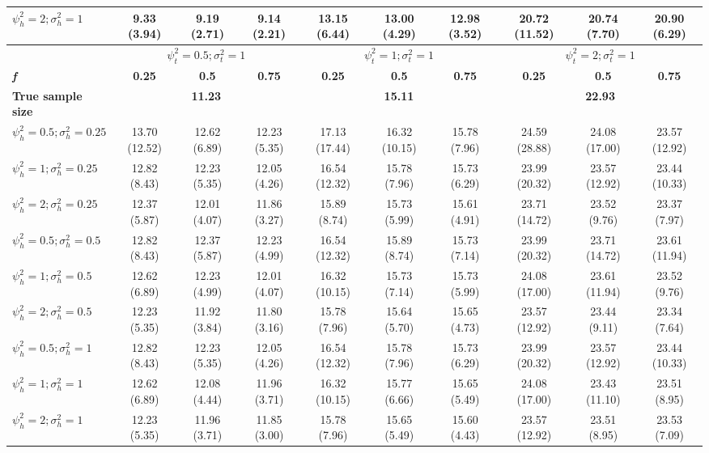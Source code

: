 \documentclass[AMA,STIX1COL,]{WileyNJD-v2}
\begin{document}
\begin{table}[ht]
{\begin{tabular}{l c c c c c c c c c}
$\psi_h^2 = 2; \sigma_h^2 = 1$ & 9.33 (3.94) & 9.19 (2.71) & 9.14 (2.21) & 13.15 (6.44) & 13.00 (4.29) & 12.98 (3.52) & 20.72 (11.52) & 20.74 (7.70) & 20.90 (6.29) \\
\hline 
 & \multicolumn{3}{c}{$\psi_t^2 = 0.5; \sigma_t^2 = 1$} & \multicolumn{3}{c}{$\psi_t^2 = 1; \sigma_t^2 = 1$} & \multicolumn{3}{c}{$\psi_t^2 = 2; \sigma_t^2 = 1$} \\
\addlinespace[1pt]
\cmidrule(lr){2-4} \cmidrule(lr){5-7} \cmidrule(lr){8-10}
\textbf{\textit{f}} & \textbf{0.25} & \textbf{0.5} & \textbf{0.75} & \textbf{0.25} & \textbf{0.5} & \textbf{0.75} & \textbf{0.25} & \textbf{0.5} & \textbf{0.75} \\
\hline
\textbf{True sample size} & \multicolumn{3}{c}{\textbf{11.23}} & \multicolumn{3}{c}{\textbf{15.11}} & \multicolumn{3}{c}{\textbf{22.93}} \\
$\psi_h^2 = 0.5; \sigma_h^2 = 0.25$ & 13.70 (12.52) & 12.62 (6.89) & 12.23 (5.35) & 17.13 (17.44) & 16.32 (10.15) & 15.78 (7.96) & 24.59 (28.88) & 24.08 (17.00) & 23.57 (12.92) \\
$\psi_h^2 = 1; \sigma_h^2 = 0.25$ & 12.82 (8.43) & 12.23 (5.35) & 12.05 (4.26) & 16.54 (12.32) & 15.78 (7.96) & 15.73 (6.29) & 23.99 (20.32) & 23.57 (12.92) & 23.44 (10.33) \\
$\psi_h^2 = 2; \sigma_h^2 = 0.25$ & 12.37 (5.87) & 12.01 (4.07) & 11.86 (3.27) & 15.89 (8.74) & 15.73 (5.99) & 15.61 (4.91) & 23.71 (14.72) & 23.52 (9.76) & 23.37 (7.97) \\
$\psi_h^2 = 0.5; \sigma_h^2 = 0.5$ & 12.82 (8.43) & 12.37 (5.87) & 12.23 (4.99) & 16.54 (12.32) & 15.89 (8.74) & 15.73 (7.14) & 23.99 (20.32) & 23.71 (14.72) & 23.61 (11.94) \\
$\psi_h^2 = 1; \sigma_h^2 = 0.5$ & 12.62 (6.89) & 12.23 (4.99) & 12.01 (4.07) & 16.32 (10.15) & 15.73 (7.14) & 15.73 (5.99) & 24.08 (17.00) & 23.61 (11.94) & 23.52 (9.76) \\
$\psi_h^2 = 2; \sigma_h^2 = 0.5$ & 12.23 (5.35) & 11.92 (3.84) & 11.80 (3.16) & 15.78 (7.96) & 15.64 (5.70) & 15.65 (4.73) & 23.57 (12.92) & 23.44 (9.11) & 23.34 (7.64) \\
$\psi_h^2 = 0.5; \sigma_h^2 = 1$ & 12.82 (8.43) & 12.23 (5.35) & 12.05 (4.26) & 16.54 (12.32) & 15.78 (7.96) & 15.73 (6.29) & 23.99 (20.32) & 23.57 (12.92) & 23.44 (10.33) \\
$\psi_h^2 = 1; \sigma_h^2 = 1$ & 12.62 (6.89) & 12.08 (4.44) & 11.96 (3.71) & 16.32 (10.15) & 15.77 (6.66) & 15.65 (5.49) & 24.08 (17.00) & 23.43 (11.10) & 23.51 (8.95) \\
$\psi_h^2 = 2; \sigma_h^2 = 1$ & 12.23 (5.35) & 11.96 (3.71) & 11.85 (3.00) & 15.78 (7.96) & 15.65 (5.49) & 15.60 (4.43) & 23.57 (12.92) &  23.51 (8.95) & 23.53 (7.09) \\
\bottomrule
\end{tabular}}
\end{table}
\end{document}
